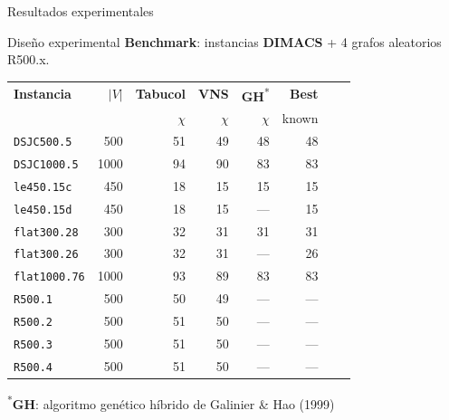 \documentclass[aspectratio=169, 11pt, xcolor={dvipsnames,table}]{beamer}
\newcommand{\azul}[1]{\textcolor{UsachAzul}{#1}}
\newcommand{\naranja}[1]{\textcolor{UsachNaranja}{#1}}
\begin{document}
\begin{frame}{Resultados experimentales \hfill}
\begin{block}{Dise\~no experimental}
\footnotesize
\textbf{Benchmark}: instancias \textbf{DIMACS} + 4 grafos aleatorios R500.x.
\end{block}

\vspace{2pt}
\centering
\footnotesize
\setlength{\tabcolsep}{3.5pt}
\begin{tabular}{@{}l r r r r r r c@{}}
\toprule
\textbf{Instancia} & $|V|$ & \textbf{Tabucol} & \textbf{VNS} & \textbf{GH}\textsuperscript{*} & \textbf{Best}  \\
 & & $\chi$ & $\chi$ & $\chi$ & known  \\
\midrule
\texttt{DSJC500.5}  & 500  & 51 & \azul{49} & \naranja{48} & 48 \\
\texttt{DSJC1000.5} & 1000 & 94 & \azul{90} & \naranja{83} & 83  \\
\texttt{le450.15c}   & 450  & 18 & \azul{15} & \naranja{15} & 15 \\
\texttt{le450.15d}   & 450  & 18 & \azul{15} & --- & 15  \\
\texttt{flat300.28}  & 300  & 32 & \azul{31} & \naranja{31} & 31 \\
\texttt{flat300.26}  & 300  & 32 & \azul{31} & --- & 26  \\
\texttt{flat1000.76} & 1000 & 93 & \azul{89} & \naranja{83} & 83  \\
\texttt{R500.1}      & 500  & 50 & \azul{49} & --- & ---  \\
\texttt{R500.2}      & 500  & 51 & \azul{50} & --- & --- \\
\texttt{R500.3}      & 500  & 51 & \azul{50} & --- & ---  \\
\texttt{R500.4}      & 500  & 51 & \azul{50} & --- & ---  \\
\bottomrule
\end{tabular}

\vspace{2pt}
{\fontsize{6}{7}\selectfont \textsuperscript{*}\textbf{GH}: algoritmo gen\'etico h\'ibrido de Galinier \& Hao (1999)}

\end{frame}


\end{document}

